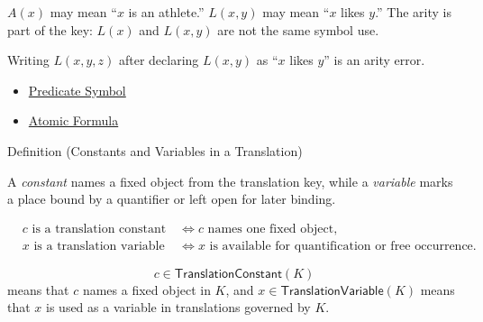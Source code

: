 \begin{remark*}[Examples]
\(A(x)\) may mean ``\(x\) is an athlete.'' \(L(x,y)\) may mean ``\(x\) likes
\(y\).'' The arity is part of the key: \(L(x)\) and \(L(x,y)\) are not the same
symbol use.
\end{remark*}

\begin{remark*}
Writing \(L(x,y,z)\) after declaring \(L(x,y)\) as ``\(x\) likes \(y\)'' is an
arity error.
\end{remark*}

\begin{dependencies}
\begin{itemize}
  \item \hyperref[def:predicate-symbol]{Predicate Symbol}
  \item \hyperref[def:atomic-formula]{Atomic Formula}
\end{itemize}
\end{dependencies}

\begin{definitionbox}{Definition (Constants and Variables in a Translation)}
\begin{definition}
\label{def:translation-constants-variables}
A \emph{constant} names a fixed object from the translation key, while a
\emph{variable} marks a place bound by a quantifier or left open for later
binding.
\end{definition}
\end{definitionbox}

\begin{remark*}
\[
\begin{aligned}
&c \text{ is a translation constant} &&\Longleftrightarrow c
  \text{ names one fixed object,}\\
&x \text{ is a translation variable} &&\Longleftrightarrow x
  \text{ is available for quantification or free occurrence.}
\end{aligned}
\]
\end{remark*}

\begin{remark*}
\[
  c\in\mathsf{TranslationConstant}(K)
\] means that \(c\) names a fixed
object in \(K\), and \(x\in\mathsf{TranslationVariable}(K)\) means that
\(x\) is used as a variable in translations governed by \(K\).
\end{remark*}

